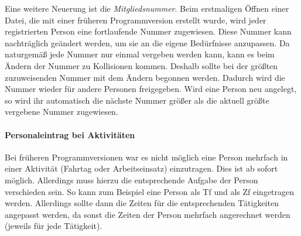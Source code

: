 Eine weitere Neuerung ist die \emph{Mitgliedsnummer}.
Beim erstmaligen Öffnen einer Datei, die mit einer früheren Programmversion erstellt wurde, wird jeder registrierten Person eine fortlaufende Nummer zugewiesen.
Diese Nummer kann nachträglich geändert werden, um sie an die eigene Bedürfnisse anzupassen.
Da naturgemäß jede Nummer nur einmal vergeben werden kann,
kann es beim Ändern der Nummer zu Kollisionen kommen.
Deshalb sollte bei der größten zuzuweisenden Nummer mit dem Ändern begonnen werden.
Dadurch wird die Nummer wieder für andere Personen freigegeben.
Wird eine Person neu angelegt,
so wird ihr automatisch die nächste Nummer größer als die aktuell größte vergebene Nummer zugewiesen.


\paragraph{Personaleintrag bei Aktivitäten}
Bei früheren Programmversionen war es nicht möglich eine Person mehrfach in einer Aktivität (Fahrtag oder Arbeitseinsatz) einzutragen.
Dies ist ab sofort möglich.
Allerdings muss hierzu die entsprechende Aufgabe der Person verschieden sein.
So kann zum Beispiel eine Person als Tf und als Zf eingetragen werden.
Allerdings sollte dann die Zeiten für die entsprechenden Tätigkeiten angepasst werden,
da sonst die Zeiten der Person mehrfach angerechnet werden (jeweils für jede Tätigkeit).
